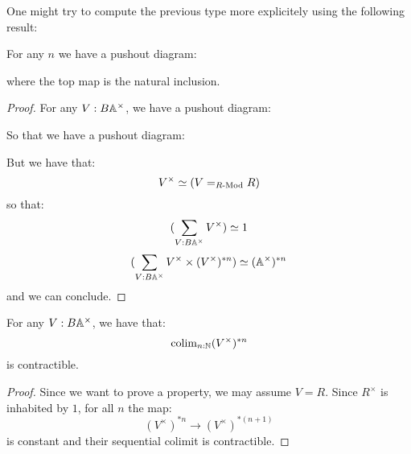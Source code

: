One might try to compute the previous type more explicitely using the following result:

\begin{lemma}
For any $n$ we have a pushout diagram:
 \begin{center}
  \end{center}
  where the top map is the natural inclusion.
\end{lemma}

\begin{proof}
For any $V:B\mathbb{A}^\times$, we have a pushout diagram:
   \begin{center}
  \end{center}
  So that we have a pushout diagram:
     \begin{center}
  \end{center}
  But we have that:
  \[V^\times \simeq (V=_{R\text{-}\mathrm{Mod}}R)\]
  so that:
  \[ (\sum_{V:B\mathbb{A}^\times}V^\times) \simeq 1\]
  \[ (\sum_{V:B\mathbb{A}^\times}V^\times\times (V^\times)^{*n}) \simeq (\mathbb{A}^\times)^{*n}\]
  and we can conclude.
\end{proof}

\begin{lemma}\label{infinite-sphere-contractible}
For any $V:B\mathbb{A}^\times$, we have that:
\[\mathrm{colim}_{n:\mathbb{N}} (V^\times)^{*n}\]
is contractible.
\end{lemma}

\begin{proof}
Since we want to prove a property, we may assume $V=R$. Since $R^\times$ is inhabited by $1$, for all $n$ the map:
\[(V^\times)^{*n} \to (V^\times)^{*(n+1)}\]
is constant and their sequential colimit is contractible.
\end{proof}

